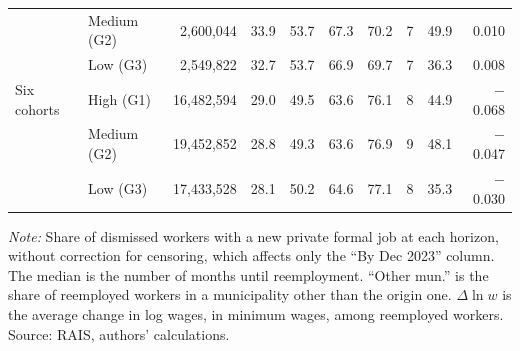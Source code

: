 {\begin{threeparttable}
\begin{tabular}{llrrrrrrrr}
 & Medium (G2) & 2,600,044 & 33.9 & 53.7 & 67.3 & 70.2 & 7 & 49.9 & 0.010 \\
 & Low (G3) & 2,549,822 & 32.7 & 53.7 & 66.9 & 69.7 & 7 & 36.3 & 0.008 \\
\addlinespace[3pt]
Six cohorts & High (G1) & 16,482,594 & 29.0 & 49.5 & 63.6 & 76.1 & 8 & 44.9 & $-$0.068 \\
 & Medium (G2) & 19,452,852 & 28.8 & 49.3 & 63.6 & 76.9 & 9 & 48.1 & $-$0.047 \\
 & Low (G3) & 17,433,528 & 28.1 & 50.2 & 64.6 & 77.1 & 8 & 35.3 & $-$0.030 \\
\bottomrule
\end{tabular}
\begin{tablenotes}[flushleft]\footnotesize
\item \textit{Note:} Share of dismissed workers with a new private formal job at each horizon, without correction for censoring, which affects only the ``By Dec 2023'' column. The median is the number of months until reemployment. ``Other mun.'' is the share of reemployed workers in a municipality other than the origin one. $\Delta \ln w$ is the average change in log wages, in minimum wages, among reemployed workers. Source: RAIS, authors' calculations.
\end{tablenotes}
\end{threeparttable}
}

